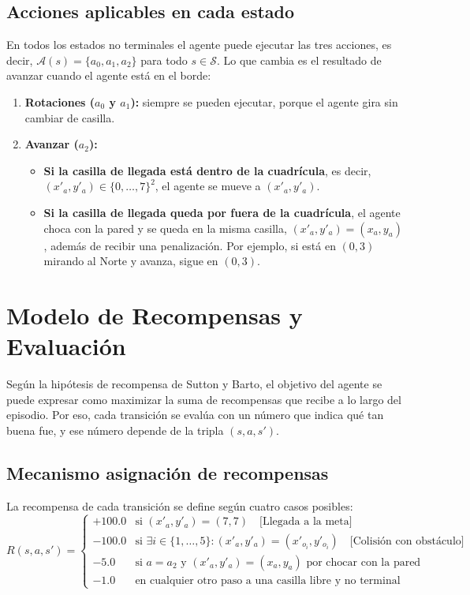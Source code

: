\documentclass[11pt,a4paper]{article}
\begin{document}
\subsection{Acciones aplicables en cada estado}
En todos los estados no terminales el agente puede ejecutar las tres acciones, es decir, $\mathcal{A}(s) = \{a_0, a_1, a_2\}$ para todo $s \in \mathcal{S}$. Lo que cambia es el resultado de avanzar cuando el agente está en el borde:
\begin{enumerate}[leftmargin=1.2cm]
    \item \textbf{Rotaciones ($a_0$ y $a_1$):} siempre se pueden ejecutar, porque el agente gira sin cambiar de casilla.
    \item \textbf{Avanzar ($a_2$):}
    \begin{itemize}
        \item \textbf{Si la casilla de llegada está dentro de la cuadrícula}, es decir, $(x'_a, y'_a) \in \{0, \dots, 7\}^2$, el agente se mueve a $(x'_a, y'_a)$.
        \item \textbf{Si la casilla de llegada queda por fuera de la cuadrícula}, el agente choca con la pared y se queda en la misma casilla, $(x'_a, y'_a) = (x_a, y_a)$, además de recibir una penalización. Por ejemplo, si está en $(0, 3)$ mirando al Norte y avanza, sigue en $(0, 3)$.
    \end{itemize}
\end{enumerate}

\section{Modelo de Recompensas y Evaluación}
Según la hipótesis de recompensa de Sutton y Barto, el objetivo del agente se puede expresar como maximizar la suma de recompensas que recibe a lo largo del episodio. Por eso, cada transición se evalúa con un número que indica qué tan buena fue, y ese número depende de la tripla $(s, a, s')$.
\subsection{Mecanismo asignación de recompensas }
La recompensa de cada transición se define según cuatro casos posibles:
\begin{equation}
    R(s, a, s') = 
    \begin{cases}
        \mathbf{+100.0} & \text{si } (x'_a, y'_a) = (7, 7) \quad \text{[Llegada a la meta]} \\
        \mathbf{-100.0} & \text{si } \exists i \in \{1,\dots,5\} : (x'_a, y'_a) = (x'_{o_i}, y'_{o_i}) \quad \text{[Colisión con obstáculo]} \\
        \mathbf{-5.0}   & \text{si } a = a_2 \text{ y } (x'_a, y'_a) = (x_a, y_a) \text{ por chocar con la pared} \\
        \mathbf{-1.0}   & \text{en cualquier otro paso a una casilla libre y no terminal}
    \end{cases}
\end{equation}
\end{document}
